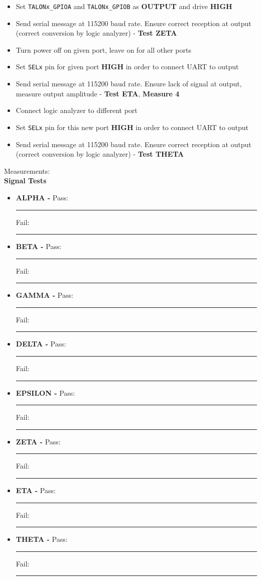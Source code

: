 \begin{itemize}
\item Set \texttt{TALONx\_GPIOA} and \texttt{TALONx\_GPIOB} as \textbf{OUTPUT} and drive \textbf{HIGH}
\item Send serial message at 115200 baud rate. Ensure correct reception at output (correct conversion by logic analyzer) - \textbf{Test ZETA}
\item Turn power off on given port, leave on for all other ports
\item Set \texttt{SELx} pin for given port \textbf{HIGH} in order to connect UART to output
\item Send serial message at 115200 baud rate. Ensure lack of signal at output, measure output amplitude - \textbf{Test ETA}, \textbf{Measure 4}
\item Connect logic analyzer to different port 
\item Set \texttt{SELx} pin for this new port \textbf{HIGH} in order to connect UART to output
\item Send serial message at 115200 baud rate. Ensure correct reception at output (correct conversion by logic analyzer) - \textbf{Test THETA}

\end{itemize}

{\Large Measurements: }\\
\textbf{Signal Tests}
\begin{itemize}
\item \textbf{ALPHA - } \hfill Pass: \rule{1cm}{0.15mm} \hspace{1cm} Fail: \rule{1cm}{0.15mm}
\item \textbf{BETA - } \hfill Pass: \rule{1cm}{0.15mm} \hspace{1cm} Fail: \rule{1cm}{0.15mm}
\item \textbf{GAMMA - } \hfill Pass: \rule{1cm}{0.15mm} \hspace{1cm} Fail: \rule{1cm}{0.15mm}
\item \textbf{DELTA - } \hfill Pass: \rule{1cm}{0.15mm} \hspace{1cm} Fail: \rule{1cm}{0.15mm}
\item \textbf{EPSILON - } \hfill Pass: \rule{1cm}{0.15mm} \hspace{1cm} Fail: \rule{1cm}{0.15mm}
\item \textbf{ZETA - } \hfill Pass: \rule{1cm}{0.15mm} \hspace{1cm} Fail: \rule{1cm}{0.15mm}
\item \textbf{ETA - } \hfill Pass: \rule{1cm}{0.15mm} \hspace{1cm} Fail: \rule{1cm}{0.15mm}
\item \textbf{THETA - } \hfill Pass: \rule{1cm}{0.15mm} \hspace{1cm} Fail: \rule{1cm}{0.15mm}
\end{itemize}

